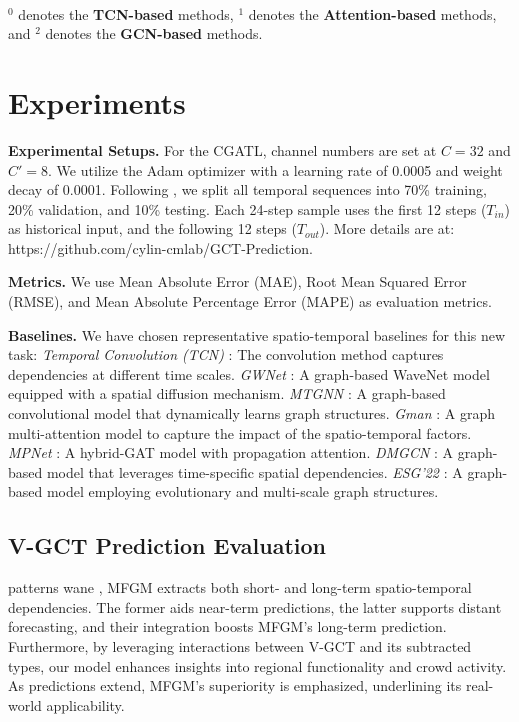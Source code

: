 \documentclass[letterpaper]{article} %
\begin{document}
\begin{table}[ht]
\begin{tabular}
\hline
\end{tabular}
\\
$^{0}$ denotes the \textbf{TCN-based} methods, $^{1}$ denotes the \textbf{Attention-based} methods, and $^{2}$ denotes the \textbf{GCN-based} methods.

\caption{Performance comparisons from short-term to long-term V-GCT predictions}
\label{table:v_gct_prediction}
\end{table}
\section{Experiments}
\noindent \textbf{Experimental Setups.}
For the CGATL, channel numbers are set at $C=32$ and $C'=8$. We utilize the Adam optimizer with a learning rate of 0.0005 and weight decay of 0.0001. Following \cite{li2018diffusion}, we split all temporal sequences into 70\% training, 20\% validation, and 10\% testing. Each 24-step sample uses the first 12 steps ($T_{in}$) as historical input, and the following 12 steps ($T_{out}$). More details are at: https://github.com/cylin-cmlab/GCT-Prediction.

\noindent \textbf{Metrics.}
We use Mean Absolute Error (MAE), Root Mean Squared Error (RMSE), and Mean Absolute Percentage Error (MAPE) as evaluation metrics.

\noindent \textbf{Baselines.} We have chosen representative spatio-temporal baselines for this new task: \textit{Temporal Convolution (TCN)} \cite{yu2015multi}: The convolution method captures dependencies at different time scales. \textit{GWNet} \cite{wu2019graph}: A graph-based WaveNet model equipped with a spatial diffusion mechanism. \textit{MTGNN} \cite{wu2020connecting}: A graph-based convolutional model that dynamically learns graph structures. \textit{Gman} \cite{zheng2020gman}: A graph multi-attention model to capture the impact of the spatio-temporal factors. \textit{MPNet} \cite{lin2021multivariate}: A hybrid-GAT model with propagation attention.
\textit{DMGCN} \cite{han2021dynamic}: A graph-based model that leverages time-specific spatial dependencies. \textit{ESG'22} \cite{ye2022learning}: A graph-based model employing evolutionary and multi-scale graph structures.

\subsection{V-GCT Prediction Evaluation}
 patterns wane \cite{ye2022learning}, MFGM extracts both short- and long-term spatio-temporal dependencies. The former aids near-term predictions, the latter supports distant forecasting, and their integration boosts MFGM's long-term prediction. Furthermore, by leveraging interactions between V-GCT and its subtracted types, our model enhances insights into regional functionality and crowd activity. As predictions extend, MFGM's superiority is emphasized, underlining its real-world applicability.
\end{document}

